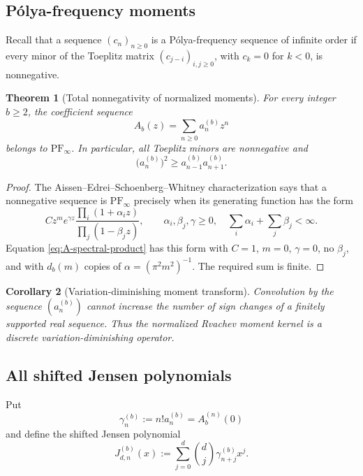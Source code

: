 \documentclass[11pt]{article}
\newtheorem{theorem}{Theorem}[section]
\newtheorem{corollary}[theorem]{Corollary}
\theoremstyle{definition}
\theoremstyle{remark}
\newcommand{\PF}{\mathrm{PF}_{\infty}}
\begin{document}
\subsection{P\'olya-frequency moments}

Recall that a sequence \((c_n)_{n\ge0}\) is a P\'olya-frequency sequence of infinite order if every minor of the Toeplitz matrix
\((c_{j-i})_{i,j\ge0}\), with \(c_k=0\) for \(k<0\), is nonnegative.

\begin{theorem}[Total nonnegativity of normalized moments]\label{thm:PF}
For every integer \(b\ge2\), the coefficient sequence
\begin{equation}
  A_b(z)=\sum_{n\ge0}a_n^{(b)}z^n
\end{equation}
belongs to \(\PF\).  In particular, all Toeplitz minors are nonnegative and
\begin{equation}\label{eq:ordinary-turan}
  \bigl(a_n^{(b)}\bigr)^2\ge a_{n-1}^{(b)}a_{n+1}^{(b)}.
\end{equation}
\end{theorem}

\begin{proof}
The Aissen--Edrei--Schoenberg--Whitney characterization \cite{Aissen1951,Aissen1952} says that a nonnegative sequence is \(\PF\) precisely when its generating function has the form
\[
 Cz^me^{\gamma z}
 \frac{\prod_i(1+\alpha_i z)}{\prod_j(1-\beta_jz)},
 \qquad \alpha_i,\beta_j,\gamma\ge0,
 \quad \sum_i\alpha_i+\sum_j\beta_j<\infty.
\]
Equation \eqref{eq:A-spectral-product} has this form with \(C=1\), \(m=0\), \(\gamma=0\), no \(\beta_j\), and with
\(d_b(m)\) copies of \(\alpha=(\pi^2m^2)^{-1}\).  The required sum is finite.
\end{proof}

\begin{corollary}[Variation-diminishing moment transform]\label{cor:variation}
Convolution by the sequence \((a_n^{(b)})\) cannot increase the number of sign changes of a finitely supported real sequence.  Thus the normalized Rvachev moment kernel is a discrete variation-diminishing operator.
\end{corollary}

\subsection{All shifted Jensen polynomials}

Put
\begin{equation}\label{eq:gamma-n}
  \gamma_n^{(b)}:=n!a_n^{(b)}=A_b^{(n)}(0)
\end{equation}
and define the shifted Jensen polynomial
\begin{equation}\label{eq:Jensen}
  J_{d,n}^{(b)}(x):=
  \sum_{j=0}^{d}\binom dj\gamma_{n+j}^{(b)}x^j.
\end{equation}
\end{document}
